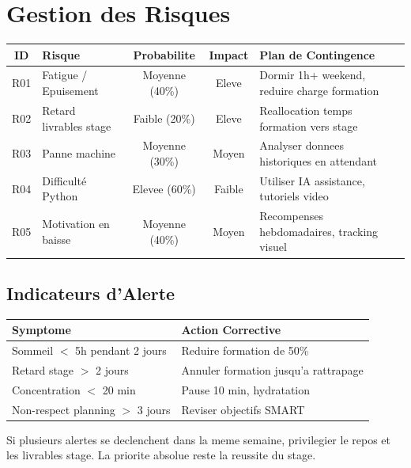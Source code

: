 \documentclass[12pt,a4paper]{article}
\begin{document}
\section{Gestion des Risques}

\begin{table}[h]
\centering
\small
\begin{tabular}{|c|p{4cm}|c|c|p{3.5cm}|}
\hline
\rowcolor{gray!20}
\textbf{ID} & \textbf{Risque} & \textbf{Probabilite} & \textbf{Impact} & \textbf{Plan de Contingence} \\
\hline
R01 & Fatigue / Epuisement & Moyenne (40\%) & Eleve & Dormir 1h+ weekend, reduire charge formation \\
R02 & Retard livrables stage & Faible (20\%) & Eleve & Reallocation temps formation vers stage \\
R03 & Panne machine & Moyenne (30\%) & Moyen & Analyser donnees historiques en attendant \\
R04 & Difficulté Python & Elevee (60\%) & Faible & Utiliser IA assistance, tutoriels video \\
R05 & Motivation en baisse & Moyenne (40\%) & Moyen & Recompenses hebdomadaires, tracking visuel \\
\hline
\end{tabular}
\end{table}

\subsection*{Indicateurs d'Alerte}

\begin{table}[h]
\centering
\begin{tabular}{|l|l|}
\hline
\rowcolor{gray!20}
\textbf{Symptome} & \textbf{Action Corrective} \\
\hline
Sommeil $<$ 5h pendant 2 jours & Reduire formation de 50\% \\
Retard stage $>$ 2 jours & Annuler formation jusqu'a rattrapage \\
Concentration $<$ 20 min & Pause 10 min, hydratation \\
Non-respect planning $>$ 3 jours & Reviser objectifs SMART \\
\hline
\end{tabular}
\end{table}

\begin{warningbox}
Si plusieurs alertes se declenchent dans la meme semaine, privilegier le repos et les livrables stage. La priorite absolue reste la reussite du stage.
\end{warningbox}
\end{document}
